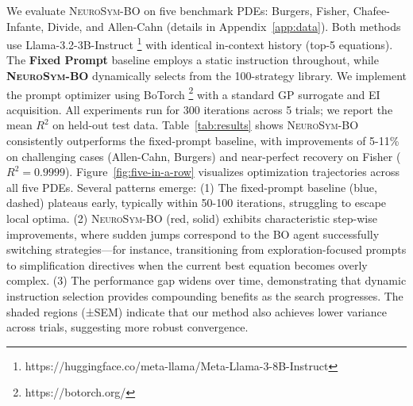 \documentclass[twoside,11pt]{article}
\newcommand{\ours}{\textsc{NeuroSym-BO}\xspace}
\newcommand{\1}{{\bf 1}}
\newcommand{\0}{{\bf 0}}
\begin{document}
We evaluate \ours on five benchmark PDEs: Burgers, Fisher, Chafee-Infante, Divide, and Allen-Cahn (details in Appendix~\ref{app:data}). Both methods use Llama-3.2-3B-Instruct \footnote{\small https://huggingface.co/meta-llama/Meta-Llama-3-8B-Instruct} with identical in-context history (top-5 equations). The \textbf{Fixed Prompt} baseline employs a static instruction throughout, while \textbf{\textsc{NeuroSym-BO}} dynamically selects from the 100-strategy library. We implement the prompt optimizer using BoTorch \footnote{https://botorch.org/} with a standard GP surrogate and EI acquisition. All experiments run for 300 iterations across 5 trials; we report the mean $R^2$ on held-out test data. 
Table~\ref{tab:results} shows \textsc{NeuroSym-BO} consistently outperforms the fixed-prompt baseline, with improvements of 5-11\% on challenging cases (Allen-Cahn, Burgers) and near-perfect recovery on Fisher ($R^2=0.9999$). Figure~\ref{fig:five-in-a-row} visualizes optimization trajectories across all five PDEs. Several patterns emerge: (1) The fixed-prompt baseline (blue, dashed) plateaus early, typically within 50-100 iterations, struggling to escape local optima. (2) \textsc{NeuroSym-BO} (red, solid) exhibits characteristic step-wise improvements, where sudden jumps correspond to the BO agent successfully switching strategies—for instance, transitioning from exploration-focused prompts to simplification directives when the current best equation becomes overly complex. (3) The performance gap widens over time, demonstrating that dynamic instruction selection provides compounding benefits as the search progresses. The shaded regions (±SEM) indicate that our method also achieves lower variance across trials, suggesting more robust convergence.
\end{document}
